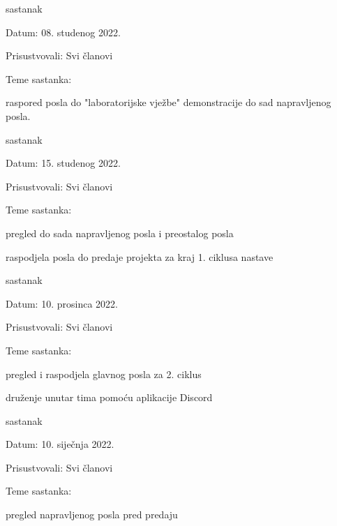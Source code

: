 \begin{packed_enum}
			\item  sastanak
			\item[] \begin{packed_item}
				\item Datum: 08. studenog 2022.
				\item Prisustvovali: Svi članovi
				\item Teme sastanka:
				\begin{packed_item}
					\item  raspored posla do "laboratorijske vježbe" demonstracije do sad napravljenog posla.
				\end{packed_item}
			\end{packed_item}

			\item  sastanak
			\item[] \begin{packed_item}
				\item Datum: 15. studenog 2022.
				\item Prisustvovali: Svi članovi
				\item Teme sastanka:
				\begin{packed_item}
					\item  pregled do sada napravljenog posla i preostalog posla
					\item raspodjela posla do predaje projekta za kraj 1. ciklusa nastave
				\end{packed_item}
			\end{packed_item}

                \item  sastanak
			\item[] \begin{packed_item}
				\item Datum: 10. prosinca 2022.
				\item Prisustvovali: Svi članovi
				\item Teme sastanka:
				\begin{packed_item}
					\item  pregled i raspodjela glavnog posla za 2. ciklus
					\item  druženje unutar tima pomoću aplikacije Discord
				\end{packed_item}
			\end{packed_item}

                \item  sastanak
			\item[] \begin{packed_item}
				\item Datum: 10. siječnja 2022.
				\item Prisustvovali: Svi članovi
				\item Teme sastanka:
				\begin{packed_item}
					\item  pregled napravljenog posla pred predaju
				\end{packed_item}
			\end{packed_item}


		\end{packed_enum}

